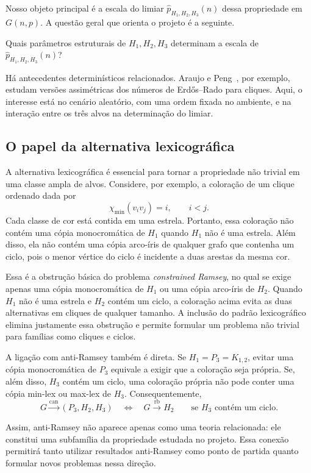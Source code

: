 \documentclass[11pt,a4paper]{article}
\newcommand{\can}{\stackrel{\mathrm{can}}{\longrightarrow}}
\newcommand{\rb}{\stackrel{\mathrm{rb}}{\longrightarrow}}
\newcommand{\Gnp}{G(n,p)}
\theoremstyle{plain}
\theoremstyle{definition}
\newcounter{question}[section]
\renewcommand{\thequestion}{\thesection.\arabic{question}}
\newenvironment{question}[1][]{%
  \refstepcounter{question}%
  \begin{tcolorbox}[
    enhanced,
    colback=qbluebg,
    colframe=qblue,
    arc=4pt,
    boxrule=1.2pt,
    left=8pt, right=8pt, top=6pt, bottom=6pt,
    fonttitle=\bfseries\sffamily,
    title={\color{white}Pergunta~\thequestion\ifx&#1&\else\ (#1)\fi},
    coltitle=white,
    attach boxed title to top left={yshift=-2mm, xshift=6pt},
    boxed title style={colback=qblue, arc=3pt, boxrule=0pt},
  ]%
  \itshape
}{%
  \end{tcolorbox}%
}
\begin{document}
Nosso objeto principal é a escala do limiar
$\widehat p_{H_1,H_2,H_3}(n)$ dessa propriedade em $\Gnp$. A questão geral
que orienta o projeto é a seguinte.

\begin{question}
  \label{q:geral}
  Quais parâmetros estruturais de $H_1,H_2,H_3$ determinam a escala de
  $\widehat p_{H_1,H_2,H_3}(n)$?
\end{question}

Há antecedentes determinísticos relacionados. Araujo e Peng~\cite{AP}, por
exemplo, estudam versões assimétricas dos números de Erdős--Rado para cliques.
Aqui, o interesse está no cenário aleatório, com uma ordem fixada no ambiente,
e na interação entre os três alvos na determinação do limiar.


\subsection{O papel da alternativa lexicográfica}


A alternativa lexicográfica é essencial para tornar a propriedade não trivial
em uma classe ampla de alvos. Considere, por exemplo, a coloração de um clique
ordenado dada por
\[
  \chi_{\min}(v_iv_j)=i,
  \qquad i<j.
\]
Cada classe de cor está contida em uma estrela. Portanto, essa coloração não
contém uma cópia monocromática de $H_1$ quando $H_1$ não é uma estrela.
Além disso, ela não contém uma cópia arco-íris de qualquer grafo que contenha
um ciclo, pois o menor vértice do ciclo é incidente a duas arestas da mesma
cor.

Essa é a obstrução básica do problema \emph{constrained Ramsey}, no qual se
exige apenas uma cópia monocromática de $H_1$ ou uma cópia arco-íris de $H_2$.
Quando $H_1$ não é uma estrela e $H_2$ contém um ciclo, a coloração acima evita
as duas alternativas em cliques de qualquer tamanho. A inclusão do padrão
lexicográfico elimina justamente essa obstrução e permite formular um problema
não trivial para famílias como cliques e ciclos.

A ligação com anti-Ramsey também é direta. Se
$H_1=P_3=K_{1,2}$, evitar uma cópia monocromática de $P_3$ equivale a exigir
que a coloração seja própria. Se, além disso, $H_3$ contém um ciclo, uma
coloração própria não pode conter uma cópia min-lex ou max-lex de $H_3$.
Consequentemente,
\[
  G\can(P_3,H_2,H_3)
  \quad\Longleftrightarrow\quad
  G\rb H_2
  \qquad\text{se $H_3$ contém um ciclo}.
\]

Assim, anti-Ramsey não aparece apenas como uma teoria relacionada: ele constitui
uma subfamília da propriedade estudada no projeto. Essa conexão permitirá tanto
utilizar resultados anti-Ramsey como ponto de partida quanto formular novos
problemas nessa direção.
\end{document}
